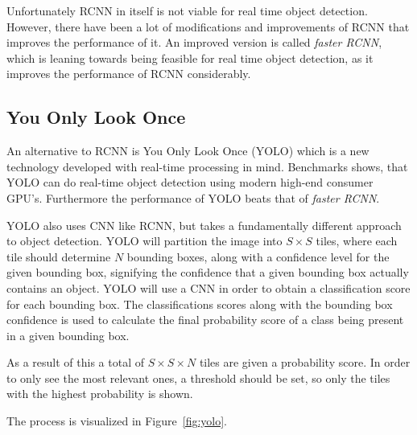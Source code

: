 Unfortunately RCNN in itself is not viable for real time object detection.
However, there have been a lot of modifications and improvements of RCNN that improves the performance of it.
An improved version is called \textit{faster RCNN}, which is leaning towards being feasible for real time object detection, as it improves the performance of RCNN considerably\cite{fasterRCNN}.

\subsection{You Only Look Once}\label{sec:YOLOAnalysis}
An alternative to RCNN is You Only Look Once (YOLO) which is a new technology developed with real-time processing in mind.
Benchmarks shows, that YOLO can do real-time object detection using modern high-end consumer GPU's.
Furthermore the performance of YOLO beats that of \textit{faster RCNN}\cite{odDetection}.

YOLO also uses CNN like RCNN, but takes a fundamentally different approach to object detection.
YOLO will partition the image into $S\times S$ tiles, where each tile should determine $N$ bounding boxes, along with a confidence level for the given bounding box, signifying the confidence that a given bounding box actually contains an object.
YOLO will use a CNN in order to obtain a classification score for each bounding box.
The classifications scores along with the bounding box confidence is used to calculate the final probability score of a class being present in a given bounding box.\cite{odDetection}

As a result of this a total of $S\times S\times N$ tiles are given a probability score.
In order to only see the most relevant ones, a threshold should be set, so only the tiles with the highest probability is shown.

The process is visualized in Figure~\ref{fig:yolo}.


